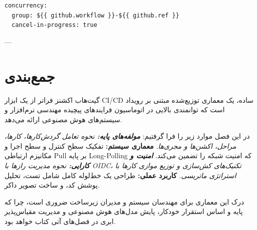 \documentclass[12pt,a4paper,openany]{book}
\begin{document}
\begin{LTR}
\begin{verbatim}
concurrency:
  group: ${{ github.workflow }}-${{ github.ref }}
  cancel-in-progress: true
\end{verbatim}
\end{LTR}

---

\section{جمع‌بندی}

گیت‌هاب اکشنز فراتر از یک ابزار CI/CD ساده، یک معماری توزیع‌شده مبتنی بر رویداد است که توانمندی بالایی در اتوماسیون فرایندهای پیچیده مهندسی نرم‌افزار و سیستم‌های هوش مصنوعی ارائه می‌دهد.

در این فصل موارد زیر را فرا گرفتیم: \textit{ \textbf{مولفه‌های پایه:} نحوه تعامل گردش‌کارها، کارها، مراحل، اکشن‌ها و مجری‌ها. } \textbf{معماری سیستم:} تفکیک سطح کنترل و سطح اجرا و مکانیزم ارتباطی Pull بر پایه Long-Polling که امنیت شبکه را تضمین می‌کند. \textit{ \textbf{امنیت و کارایی:} نحوه مدیریت رازها با OIDC، تکنیک‌های کش‌سازی و توزیع موازی کارها با استراتژی ماتریسی. } \textbf{کاربرد عملی:} طراحی یک خط‌لوله کامل شامل تست، تحلیل پوشش کد، و ساخت تصویر داکر.

درک این معماری برای مهندسان سیستم و مدیران زیرساخت ضروری است، چرا که پایه و اساس استقرار خودکار، پایش مدل‌های هوش مصنوعی  و مدیریت مقیاس‌پذیر ابری در فصل‌های آتی کتاب خواهد بود.
\end{document}
